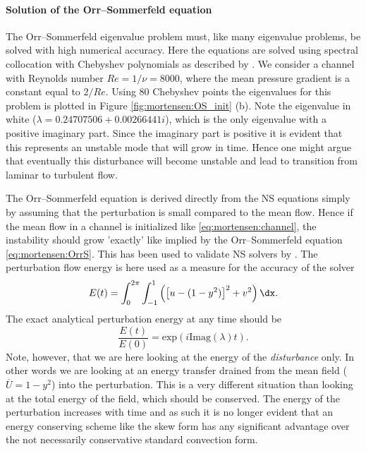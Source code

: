 \paragraph{Solution of the Orr--Sommerfeld equation}

The Orr--Sommerfeld eigenvalue problem must, like many eigenvalue
problems, be solved with high numerical accuracy. Here the equations
are solved using spectral collocation with Chebyshev polynomials as
described by \citet{Trefethen2006}. We consider a channel with Reynolds
number $Re=1/\nu=8000$, where the mean pressure gradient is a constant
equal to $2/Re$. Using 80 Chebyshev points the eigenvalues for this
problem is plotted in Figure \ref{fig:mortensen:OS_init} (b). Note the
eigenvalue in white ($\lambda = 0.24707506 + 0.00266441 i$), which is the
only eigenvalue with a positive imaginary part. Since the imaginary part
is positive it is evident that this represents an unstable mode that will
grow in time. Hence one might argue that eventually this disturbance will
become unstable and lead to transition from laminar to turbulent flow.

The Orr--Sommerfeld equation is derived directly from the NS equations
simply by assuming that the perturbation is small compared to the
mean flow. Hence if the mean flow in a channel is initialized like
\eqref{eq:mortensen:channel}, the instability should grow 'exactly' like
implied by the Orr--Sommerfeld equation \eqref{eq:mortensen:OrrS}. This
has been used to validate NS solvers by \citet{MalikZangHussaini1984}. The
perturbation flow energy is here used as a measure for the accuracy of
the solver
\begin{equation}
  E(t)= \int_0^{2\pi}\int_{-1}^{1} \left( \left[u-(1-y^2)\right]^2
    + v^2 \right) \dx.
\end{equation}
The exact analytical perturbation energy at any time should be
\begin{equation}
 \frac{E(t)}{E(0)}=\text{exp}(i \text{Imag}(\lambda) t).
\end{equation}
Note, however, that we are here looking at the energy of the
\textit{disturbance} only. In other words we are looking at an energy
transfer drained from the mean field ($\overline{U}=1-y^2$) into the
perturbation. This is a very different situation than looking at the
total energy of the field, which should be conserved. The energy of the
perturbation increases with time and as such it is no longer evident
that an energy conserving scheme like the skew form has any significant
advantage over the not necessarily conservative standard convection form.

